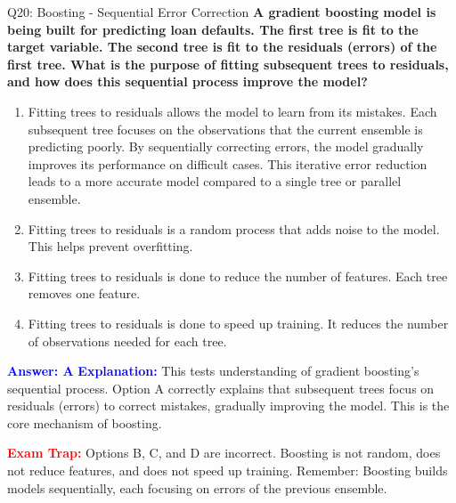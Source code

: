 \documentclass[8pt]{beamer}
\begin{document}
	\begin{frame}{Q20: Boosting - Sequential Error Correction}
		\fontsize{6.5}{7.5}\selectfont
		\textbf{A gradient boosting model is being built for predicting loan defaults. The first tree is fit to the target variable. The second tree is fit to the residuals (errors) of the first tree. What is the purpose of fitting subsequent trees to residuals, and how does this sequential process improve the model?}
		
		\begin{enumerate}
			\item Fitting trees to residuals allows the model to learn from its mistakes. Each subsequent tree focuses on the observations that the current ensemble is predicting poorly. By sequentially correcting errors, the model gradually improves its performance on difficult cases. This iterative error reduction leads to a more accurate model compared to a single tree or parallel ensemble.
			\item Fitting trees to residuals is a random process that adds noise to the model. This helps prevent overfitting.
			\item Fitting trees to residuals is done to reduce the number of features. Each tree removes one feature.
			\item Fitting trees to residuals is done to speed up training. It reduces the number of observations needed for each tree.
		\end{enumerate}
		
		\vspace{0.1cm}
		\textcolor{blue}{\textbf{Answer: A}}
		\vspace{0.1cm}
		\textcolor{blue}{\textbf{Explanation:}} This tests understanding of gradient boosting's sequential process. Option A correctly explains that subsequent trees focus on residuals (errors) to correct mistakes, gradually improving the model. This is the core mechanism of boosting.
		
		\textcolor{red}{\textbf{Exam Trap:}} Options B, C, and D are incorrect. Boosting is not random, does not reduce features, and does not speed up training. Remember: Boosting builds models sequentially, each focusing on errors of the previous ensemble.
	\end{frame}
	
\end{document}
